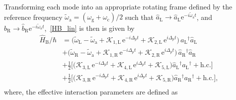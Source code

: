 \documentclass[%
reprint,
floatfix,
superscriptaddress,
amsmath,amssymb,
aps,
pra,
]{revtex4-2}
\newcommand*{\scrpt}[1]{\mathrm{#1}}
\newcommand*{\s}[1]{\ensuremath{_\scrpt{#1}}}
\begin{document}
Transforming each mode into an appropriate rotating frame defined by the reference frequency $\tilde{\omega}\s{a} = (\omega\s{g} + \omega\s{c})/2$ such that $\hat{a}\s{L} \rightarrow \hat{a}\s{L} \mathrm{e}^{- i \tilde{\omega}\s{a} t}$, and $\hat{b}\s{R} \rightarrow \hat{b}\s{R} \mathrm{e}^{- i \tilde{\omega}\s{a} t}$,~\cref{HB_lin} is then is given by
%
\begin{align}
    \label{HB_lin_Rxy}
    \hat H\s{B} / \hbar & = \big( \tilde{\omega}\s{L} - \tilde{\omega}\s{a} + \mathcal{K}\s{1,L} \, \mathrm{e}^{-i \Delta_p t} + \mathcal{K}\s{2,L} \, \mathrm{e}^{i \Delta_p t} \Big) \, \hat a\s{L}^{\dagger} \hat a\s{L} \nonumber  \\
    & +  \Big( \tilde{\omega}\s{R} - \tilde{\omega}\s{a} + \mathcal{K}\s{1,R} \, \mathrm{e}^{-i \Delta_p t} + \mathcal{K}\s{2,R} \, \mathrm{e}^{i \Delta_p t} \Big) \, \hat a\s{R}^{\dagger} \hat a\s{R} \nonumber \\ 
    & + \frac{1}{2} \Big[ \Big( \mathcal{K}\s{3,L} \, \mathrm{e}^{- i \Delta_p  t} + \mathcal{K}\s{4,L} \, \mathrm{e}^{ i \Delta_p  t} \nonumber + \mathcal{K}\s{5,L} \Big) \hat a\s{L}^{\dagger}  a\s{L}^{\dagger}  + \mathrm{h.c.} \Big] \nonumber \\  
   & + \frac{1}{2} \Big[ \Big( \mathcal{K}\s{3,R} \, \mathrm{e}^{- i \Delta_p t} + \mathcal{K}\s{4,R} \, \mathrm{e}^{ i \Delta_p t} \nonumber + \mathcal{K}\s{5,R} \Big) \hat a\s{R}^{\dagger}  a\s{R}^{\dagger}  + \mathrm{h.c.} \Big] \nonumber,\\
\end{align}
%
where, the effective interaction parameters are defined as
\end{document}
